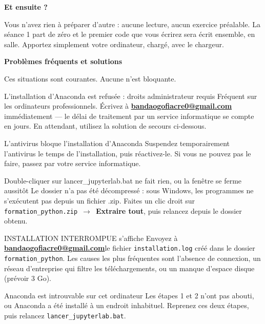 \documentclass[11pt,a4paper]{article}
\makeatletter
\newcommand{\titregrand}[1]{%
  \par\vspace{10pt}%
  {\Large\bfseries\color{bleufonce}#1}%
  \par\vspace{6pt}}
\newcommand{\titrepetit}[1]{%
  \par\vspace{10pt}%
  {\large\bfseries\color{bleuclair}#1}%
  \par\vspace{4pt}}
\newcommand{\courriel}{bandaogofiacre0@gmail.com}
\newcommand{\adressecontact}{%
  \href{mailto:\courriel}{\textbf{\color{bleuclair}\courriel}}}
\newcommand{\fichier}[1]{\texttt{#1}}
\newcommand{\fleche}{~$\rightarrow$~}
\makeatother
\begin{document}
\vspace{-20pt}
\titrepetit{Et ensuite ?}

Vous n'avez rien à préparer d'autre : aucune lecture, aucun exercice préalable.
La séance 1 part de zéro et le premier code que vous écrirez sera écrit ensemble,
en salle. Apportez simplement votre ordinateur, chargé, avec le chargeur.


\newpage
\titregrand{Problèmes fréquents et solutions}
{\small\color{grismoyen}Ces situations sont courantes. Aucune n'est bloquante.\par}
\vspace{6pt}

\begin{probleme}{L'installation d'Anaconda est refusée : \og droits administrateur requis\fg{}}
Fréquent sur les ordinateurs professionnels. Écrivez à \adressecontact
immédiatement — le délai de traitement par un service informatique se compte en
jours. En attendant, utilisez la solution de secours ci-dessous.
\end{probleme}

\begin{probleme}{L'antivirus bloque l'installation d'Anaconda}
Suspendez temporairement l'antivirus le temps de l'installation, puis
réactivez-le. Si vous ne pouvez pas le faire, passez par votre service
informatique.
\end{probleme}

\begin{probleme}{Double-cliquer sur lancer\_jupyterlab.bat ne fait rien, ou la fenêtre se ferme aussitôt}
Le dossier n'a pas été décompressé : sous Windows, les programmes ne s'exécutent
pas depuis un fichier .zip. Faites un clic droit sur
\fichier{formation\_python.zip}\fleche\textbf{Extraire tout}, puis relancez
depuis le dossier obtenu.
\end{probleme}

\begin{probleme}{\og INSTALLATION INTERROMPUE\fg{} s'affiche}
Envoyez à \adressecontact le fichier \fichier{installation.log} créé dans le dossier
\fichier{formation\_python}. Les causes les plus fréquentes sont l'absence de
connexion, un réseau d'entreprise qui filtre les téléchargements, ou un manque
d'espace disque (prévoir 3 Go).
\end{probleme}

\begin{probleme}{\og Anaconda est introuvable sur cet ordinateur\fg{}}
Les étapes 1 et 2 n'ont pas abouti, ou Anaconda a été installé à un endroit
inhabituel. Reprenez ces deux étapes, puis relancez
\fichier{lancer\_jupyterlab.bat}.
\end{probleme}
\end{document}
